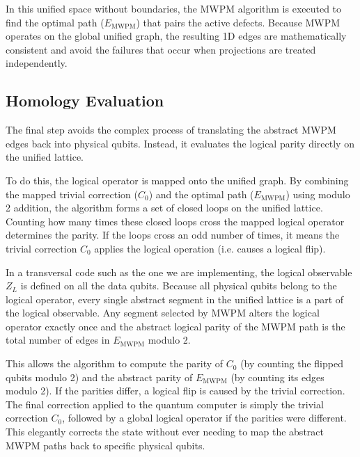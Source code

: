 In this unified space without boundaries, the MWPM algorithm is executed to find the optimal path ($E_{\text{MWPM}}$) that pairs the active defects. Because MWPM operates on the global unified graph, the resulting 1D edges are mathematically consistent and avoid the failures that occur when projections are treated independently.

\subsection{Homology Evaluation}
The final step avoids the complex process of translating the abstract MWPM edges back into physical qubits. Instead, it evaluates the logical parity directly on the unified lattice.

To do this, the logical operator is mapped onto the unified graph. By combining the mapped trivial correction ($C_0$) and the optimal path ($E_{\text{MWPM}}$) using modulo 2 addition, the algorithm forms a set of closed loops on the unified lattice. Counting how many times these closed loops cross the mapped logical operator determines the parity. If the loops cross an odd number of times, it means the trivial correction $C_0$ applies the logical operation (i.e. causes a logical flip).

 In a transversal code such as the one we are implementing, the logical observable $Z_L$ is defined on all the data qubits. Because all physical qubits belong to the logical operator, every single abstract segment in the unified lattice is a part of the logical observable. Any segment selected by MWPM alters the logical operator exactly once and the abstract logical parity of the MWPM path is the total number of edges in $E_{\text{MWPM}}$ modulo 2. 

This allows the algorithm to compute the parity of $C_0$ (by counting the flipped qubits modulo 2) and the abstract parity of $E_{\text{MWPM}}$ (by counting its edges modulo 2). If the parities differ, a logical flip is caused by the trivial correction. The final correction applied to the quantum computer is simply the trivial correction $C_0$, followed by a global logical operator if the parities were different. This elegantly corrects the state without ever needing to map the abstract MWPM paths back to specific physical qubits.

